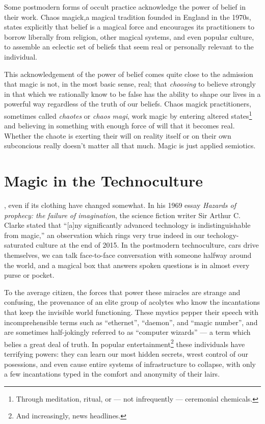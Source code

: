 \documentclass[a4paper,nobib]{tufte-handout}
\begin{document}
Some postmodern forms of occult practice acknowledge the power of belief in their work. Chaos magick,a magical tradition founded in England in the 1970s, states explicitly that belief is a magical force\autocite{carroll1987liber,carroll1992liber,sherwin1992book}  and encourages its practitioners to borrow liberally from religion, other magical systems, and even popular culture, to assemble an eclectic set of beliefs that seem real or personally relevant to the individual.\autocite{carroll1987liber,carroll1992liber,sherwin1992book}

This acknowledgement of the power of belief comes quite close to the admission that magic is not, in the most basic sense, real; that \emph{choosing} to believe strongly in that which we rationally know to be false has the ability to shape our lives in a powerful way regardless of the truth of our beliefs. Chaos magick practitioners, sometimes called \emph{chaotes} or \emph{chaos magi}, work magic by entering altered states\footnote{Through meditation, ritual, or --- not infrequently --- ceremonial chemicals.} and believing in something with enough force of will that it becomes real.\autocite{carroll1987liber,carroll1992liber,sherwin1992book}  Whether the chaote is exerting their will on reality itself or on their own subconcious really doesn't matter all that much. Magic is just applied semiotics.

\section{Magic in the Technoculture}

, even if its clothing have changed somewhat. In his 1969 essay \emph{Hazards of prophecy: the failure of imagination}, the science fiction writer Sir Arthur C. Clarke stated that ``[a]ny significantly advanced technology is indistinguishable from magic,''\autocite{clarke1962hazards} an observation which rings very true indeed in our techology-saturated culture at the end of 2015. In the postmodern technoculture, cars drive themselves, we can talk face-to-face conversation with someone halfway around the world, and a magical box that answers spoken questions is in almost every purse or pocket.

To the average citizen, the forces that power these miracles are strange and confusing, the provenance of an elite group of acolytes who know the incantations that keep the invisible world functioning. These mystics pepper their speech with incomprehensible terms such as ``ethernet'', ``daemon'', and ``magic number'', and are sometimes half-jokingly referred to as ``computer wizards'' --- a term which belies a great deal of truth. In popular entertainment\footnote{And increasingly, news headlines.} these individuals have terrifying powers: they can learn our most hidden secrets, wrest control of our posessions, and even cause entire systems of infrastructure to collapse, with only a few incantations typed in the comfort and anonymity of their lairs.
\end{document}
